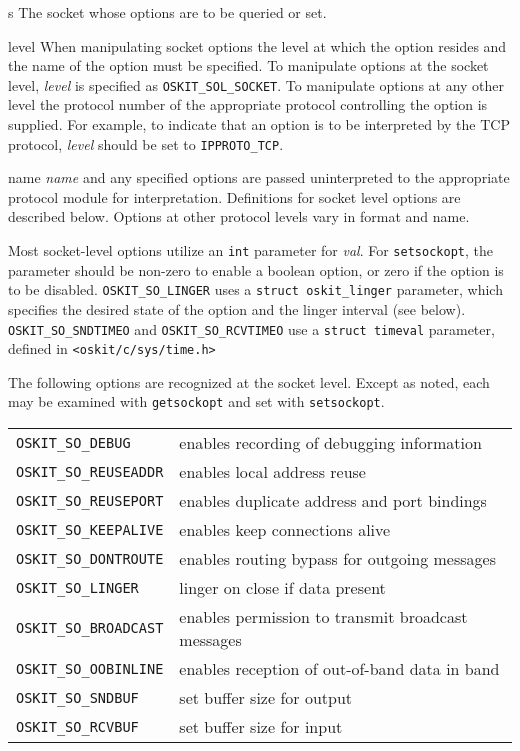 \begin{apiparm}
        \item[s]
                The socket whose options are to be queried or set.

        \item[level] When manipulating socket options the level at 
	which the option resides and the name of the option must be 
	specified.  To manipulate options at the socket level, \emph{level} 
	is specified as \texttt{OSKIT_SOL_SOCKET}. To manipulate options
	at any other level the protocol number of the appropriate protocol 
	controlling the option is supplied.  For example, to indicate that an
	option is to be interpreted by the TCP protocol, \emph{level} 
	should be set to \texttt{IPPROTO_TCP}.

        \item[name]
	\emph{name} and any specified options are passed uninterpreted to the
	appropriate protocol module for interpretation.
	Definitions for socket level options are described below.
	Options at other protocol levels vary in format and name.

	Most socket-level options utilize an \texttt{int} parameter for 
	\emph{val}. For \texttt{setsockopt}, the parameter should be
	non-zero to enable a boolean option, or zero if the option is 
	to be disabled.
	\texttt{OSKIT_SO_LINGER} uses a \texttt{struct oskit_linger}
	parameter, which specifies the desired state of the option
	and the linger interval (see below).
	\texttt{OSKIT_SO_SNDTIMEO} and \texttt{OSKIT_SO_RCVTIMEO}
	use a \texttt{struct timeval} parameter, defined in 
	\texttt{<oskit/c/sys/time.h>}

	The following options are recognized at the socket level.  Except as 
	noted, each may be examined with \texttt{getsockopt} and set with
	\texttt{setsockopt}.

	\begin{tabular}{ll}
           \texttt{OSKIT_SO_DEBUG} &
		        enables recording of debugging information \\
           \texttt{OSKIT_SO_REUSEADDR} &
		    enables local address reuse \\
           \texttt{OSKIT_SO_REUSEPORT} &
		    enables duplicate address and port bindings \\
           \texttt{OSKIT_SO_KEEPALIVE} &
		    enables keep connections alive \\
           \texttt{OSKIT_SO_DONTROUTE} &
		    enables routing bypass for outgoing messages \\
           \texttt{OSKIT_SO_LINGER} &
		       linger on close if data present \\
           \texttt{OSKIT_SO_BROADCAST} &
		    enables permission to transmit broadcast messages \\
           \texttt{OSKIT_SO_OOBINLINE} &
		    enables reception of out-of-band data in band \\
           \texttt{OSKIT_SO_SNDBUF} &
		       set buffer size for output \\
           \texttt{OSKIT_SO_RCVBUF} &
		       set buffer size for input \\


\end{tabular}
\end{apiparm}
